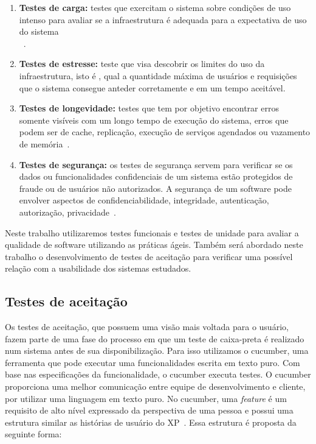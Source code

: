 \begin{enumerate}
\item \textbf{Testes de carga:}  testes que exercitam o sistema sobre condições de uso 
intenso para avaliar se a infraestrutura é adequada para a expectativa de uso do 
sistema\\~\cite{avritze1994}.

\item \textbf{Testes de estresse:} teste que visa descobrir os limites do uso da 
infraestrutura, isto é , qual a quantidade máxima de usuários e requisições que o 
sistema consegue anteder corretamente e em um tempo aceitável.

\item \textbf{Testes de longevidade:} testes que tem por objetivo encontrar erros 
somente visíveis com um longo tempo de execução do sistema, erros que podem ser de cache, replicação, execução de serviços agendados ou vazamento de memória~\cite{bernardo2011}.

\item \textbf{Testes de segurança:} os testes de segurança servem para verificar se 
os dados ou funcionalidades confidenciais de um sistema  estão protegidos de fraude 
ou de usuários não autorizados. A segurança de um software pode envolver aspectos de 
confidenciabilidade, integridade, autenticação, autorização, privacidade~\cite{whittaker2006}.

\end{enumerate}

Neste trabalho utilizaremos testes funcionais e testes de unidade para avaliar a qualidade de software utilizando as práticas ágeis. Também será abordado neste trabalho o desenvolvimento de testes de aceitação para verificar uma possível relação com a usabilidade dos sistemas estudados. 

\subsection{Testes de aceitação}

Os testes de aceitação, que possuem uma visão mais voltada para o usuário, fazem 
parte de uma fase do processo em que um teste de caixa-preta é realizado 
num sistema antes de sua disponibilização.
Para isso utilizamos o cucumber, uma ferramenta que pode executar uma funcionalidades escrita em texto puro. Com base nas especificações da funcionalidade, o cucumber executa testes. O cucumber proporciona uma melhor comunicação entre equipe de desenvolvimento e cliente, por utilizar uma linguagem  em texto puro.
%
No cucumber, uma \textit{feature} é um requisito de alto nível 
expressado da perspectiva de uma pessoa e possui uma estrutura similar as histórias 
de usuário do XP~. Essa estrutura é proposta da seguinte forma:

